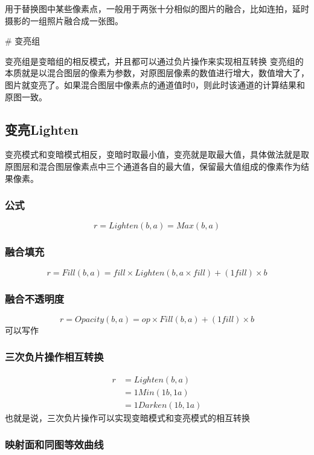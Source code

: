 用于替换图中某些像素点，一般用于两张十分相似的图片的融合，比如连拍，延时摄影的一组照片融合成一张图。

# 变亮组

变亮组是变暗组的相反模式，并且都可以通过负片操作来实现相互转换
变亮组的本质就是以混合图层的像素为参数，对原图层像素的数值进行增大，数值增大了，图片就变亮了。如果混合图层中像素点的通道值时0，则此时该通道的计算结果和原图一致。

\subsection{ 变亮Lighten}

变亮模式和变暗模式相反，变暗时取最小值，变亮就是取最大值，具体做法就是取原图层和混合图层像素点中三个通道各自的最大值，保留最大值组成的像素作为结果像素。

\subsubsection{ 公式}

$$r=Lighten(b,a)=Max(b,a)$$

\subsubsection{ 融合填充}

$$r= Fill(b,a) =fill\times Lighten(b,a\times fill)+(1fill)\times b$$

\subsubsection{ 融合不透明度}

$$r=Opacity(b,a)=op\times Fill(b,a)+(1fill)\times b$$
可以写作

\subsubsection{ 三次负片操作相互转换}

$$\begin{aligned}
	r&=Lighten(b,a)\\&=1Min(1b,1a)\\&= 1Darken(1b,1a)
\end{aligned}$$
也就是说，三次负片操作可以实现变暗模式和变亮模式的相互转换

\subsubsection{ 映射面和同图等效曲线}

